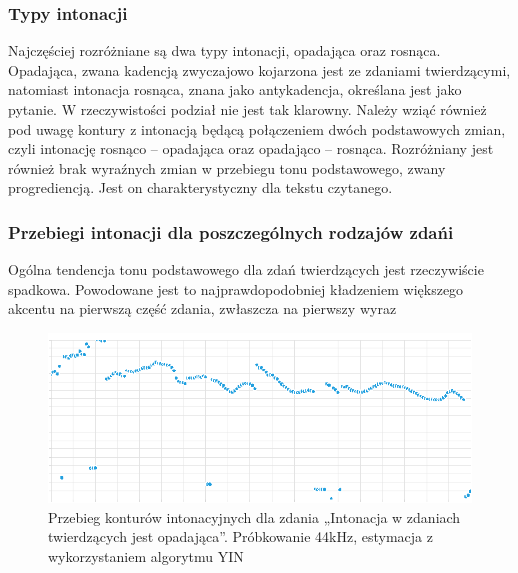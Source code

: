 \documentclass[a4paper,12 pt]{article}
\begin{document}
\subsubsection{Typy intonacji}
Najczęściej rozróżniane są dwa typy intonacji, opadająca oraz rosnąca. Opadająca, zwana kadencją zwyczajowo kojarzona jest ze zdaniami twierdzącymi, natomiast intonacja rosnąca, znana jako antykadencja, określana jest jako pytanie. W rzeczywistości podział nie jest tak klarowny. Należy wziąć również pod uwagę kontury z intonacją będącą połączeniem dwóch podstawowych zmian, czyli intonację rosnąco – opadająca oraz opadająco – rosnąca. Rozróżniany jest również brak wyraźnych zmian w przebiegu tonu podstawowego, zwany progrediencją. Jest on charakterystyczny dla tekstu czytanego.

\subsubsection{Przebiegi intonacji dla poszczególnych rodzajów zdańi}
Ogólna tendencja tonu podstawowego dla zdań twierdzących jest rzeczywiście spadkowa. Powodowane jest to najprawdopodobniej kładzeniem większego akcentu na pierwszą część zdania, zwłaszcza na pierwszy wyraz
\begin{figure}[h]
\centering
\includegraphics[scale=0.7]{zdanie_twierdzace.png}
\caption{Przebieg konturów intonacyjnych dla zdania „Intonacja w zdaniach twierdzących jest opadająca”. Próbkowanie 44kHz, estymacja z wykorzystaniem algorytmu YIN}
\end{figure}
\FloatBarrier
\end{document}

